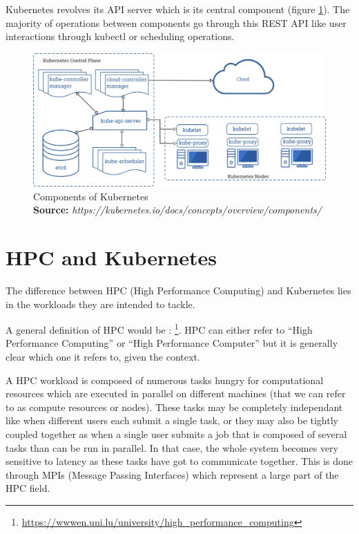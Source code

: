 \documentclass[12pt]{report}
\newcommand*{\captionsource}[2]{%
    \caption[{#1}]{%
        #1%
        \\\hspace{\linewidth}%
	\textbf{Source:} \textit{#2}%
    }%
}
\begin{document}
Kubernetes revolves its API server which is its central component (figure
\ref{fig:kube-components}). The majority of operations between components go
through this REST API like user interactions through kubectl or scheduling
operations.

\begin{figure}[h]
	\centering
	\includegraphics[width=\textwidth]{../imgs/components-of-kubernetes.png}
	\captionsource{Components of Kubernetes}{https://kubernetes.io/docs/concepts/overview/components/}
	\label{fig:kube-components}
\end{figure}

\section{HPC and Kubernetes}
The difference between HPC (High Performance Computing) and Kubernetes lies in
the workloads they are intended to tackle.

A general definition of HPC would be :
\footnote{\url{https://wwwen.uni.lu/university/high_performance_computing}}.
HPC can either refer to ``High Performance Computing'' or ``High Performance
Computer'' but it is generally clear which one it refers to, given the
context.

A HPC workload is composed of numerous tasks hungry for computational resources
which are executed in parallel on different machines (that we can refer to as
compute resources or nodes). These tasks may be completely independant like
when different users each submit a single task, or they may also be tightly
coupled together as when a single user submits a job that is composed of
several tasks than can be run in parallel. In that case, the whole system
becomes very sensitive to latency as these tasks have got to communicate
together. This is done through MPIs (Message Passing Interfaces) which
represent a large part of the HPC field.\\
\end{document}
